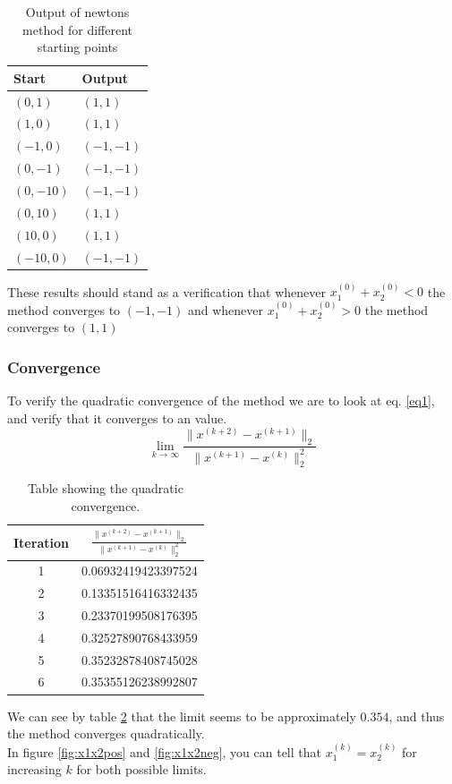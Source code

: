 \documentclass[12pt, a4paper,usenames,dvipsnames]{article}
\begin{document}
\begin{table}[h!]
    \centering
    \begin{tabular}{ll}
        Start & Output  \\ \hline
        \((0,1)\) &\((1,1)\)\\
        \((1,0)\)&\((1,1)\)\\
        \((-1,0)\)&\((-1,-1)\)\\
        \((0,-1)\)&\((-1,-1)\)\\
        \((0,-10)\)&\((-1,-1)\)\\
        \((0,10)\)&\((1,1)\)\\
        \((10,0)\)&\((1,1)\)\\
        \((-10,0)\)&\((-1,-1)\)
    \end{tabular}
    \caption{Output of newtons method for different starting points}
    \label{tab:outNewt}
\end{table}
These results should stand as a verification that whenever \(x_1^{(0)}+x_2^{(0)}<0\) the method converges to \((-1,-1)\) and whenever \(x_1^{(0)}+x_2^{(0)}>0\) the method converges to \((1,1)\)
\subsubsection*{Convergence}
To verify the quadratic convergence of the method we are to look at eq. \ref{eq1}, and verify that it converges to an value. 
\begin{equation}
    \lim_{k\to\infty}\frac{\|x^{(k+2)}-x^{(k+1)}\|_2}{\|x^{(k+1)}-x^{(k)}\|_2^2}
    \label{eq1}
\end{equation}
\begin{table}[h!]
    \centering
    \begin{tabular}{cc}
        Iteration & \(\frac{\|x^{(k+2)}-x^{(k+1)}\|_2}{\|x^{(k+1)}-x^{(k)}\|_2^2}\)  \\ \hline
        1&0.06932419423397524\\
        2&0.13351516416332435\\
        3&0.23370199508176395\\
        4&0.32527890768433959\\
        5&0.35232878408745028\\
        6&0.35355126238992807
    \end{tabular}
    \caption{Table showing the quadratic convergence.}
    \label{tab:quadconv}
\end{table}

\noindent We can see by table \ref{tab:quadconv} that the limit seems to be approximately \(0.354\), and thus the method converges quadratically.\\
In figure \ref{fig:x1x2pos} and \ref{fig:x1x2neg}, you can tell that \(x_1^{(k)}=x_2^{(k)}\) for increasing \(k\) for both possible limits.
\end{document}
